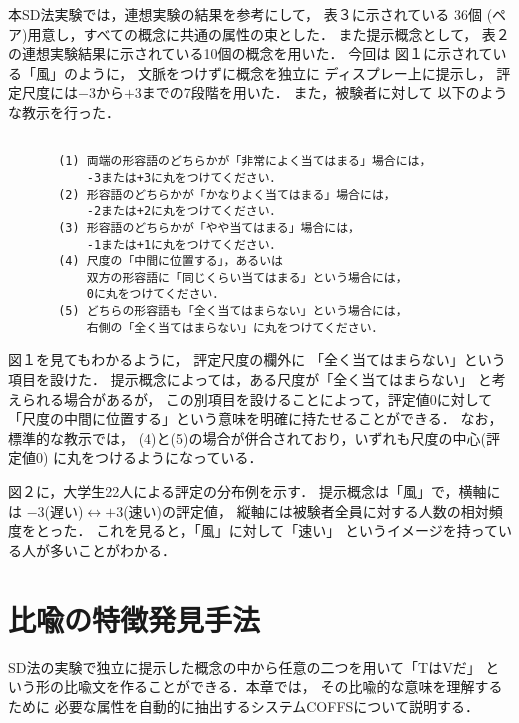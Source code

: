 本SD法実験では，連想実験の結果を参考にして，
表３に示されている
36個
(ペア)用意し，すべての概念に共通の属性の束とした．
また提示概念として，
表２の連想実験結果に示されている10個の概念を用いた．
今回は 図１に示されている「風」のように，
文脈をつけずに概念を独立に
ディスプレー上に提示し，
評定尺度には$-3$から$+3$までの7段階を用いた．
また，被験者に対して
以下のような教示を行った．



\begin{footnotesize}
\begin{verbatim}

       (1) 両端の形容語のどちらかが「非常によく当てはまる」場合には，
           -3または+3に丸をつけてください．
       (2) 形容語のどちらかが「かなりよく当てはまる」場合には，
           -2または+2に丸をつけてください．
       (3) 形容語のどちらかが「やや当てはまる」場合には，
           -1または+1に丸をつけてください．
       (4) 尺度の「中間に位置する」，あるいは
           双方の形容語に「同じくらい当てはまる」という場合には， 
           0に丸をつけてください．
       (5) どちらの形容語も「全く当てはまらない」という場合には，
           右側の「全く当てはまらない」に丸をつけてください．

\end{verbatim}
\end{footnotesize}


\vspace{-4mm}
図１を見てもわかるように，
評定尺度の欄外に
「全く当てはまらない」という項目を設けた．
提示概念によっては，ある尺度が「全く当てはまらない」
と考えられる場合があるが，
この別項目を設けることによって，評定値0に対して
「尺度の中間に位置する」という意味を明確に持たせることができる．
なお，標準的な教示では，
(4)と(5)の場合が併合されており，いずれも尺度の中心(評定値0)
に丸をつけるようになっている\cite{Iwashita1983}．

図２に，大学生22人による評定の分布例を示す．
提示概念は「風」で，横軸には
$-3$(遅い)$\longleftrightarrow$$+3$(速い)の評定値，
縦軸には被験者全員に対する人数の相対頻度をとった．
これを見ると，「風」に対して「速い」
というイメージを持っている人が多いことがわかる．



\section{比喩の特徴発見手法}

SD法の実験で独立に提示した概念の中から任意の二つを用いて「TはVだ」
という形の比喩文を作ることができる．本章では，
その比喩的な意味を理解するために
必要な属性を自動的に抽出するシステムCOFFSについて説明する．

